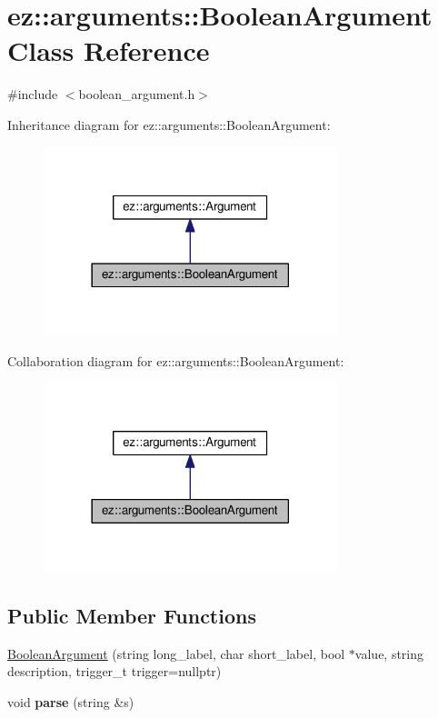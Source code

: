 \hypertarget{classez_1_1arguments_1_1BooleanArgument}{}\section{ez\+:\+:arguments\+:\+:Boolean\+Argument Class Reference}
\label{classez_1_1arguments_1_1BooleanArgument}


{\ttfamily \#include $<$boolean\+\_\+argument.\+h$>$}



Inheritance diagram for ez\+:\+:arguments\+:\+:Boolean\+Argument\+:
\nopagebreak
\begin{figure}[H]
\begin{center}
\leavevmode
\includegraphics[width=242pt]{classez_1_1arguments_1_1BooleanArgument__inherit__graph}
\end{center}
\end{figure}


Collaboration diagram for ez\+:\+:arguments\+:\+:Boolean\+Argument\+:
\nopagebreak
\begin{figure}[H]
\begin{center}
\leavevmode
\includegraphics[width=242pt]{classez_1_1arguments_1_1BooleanArgument__coll__graph}
\end{center}
\end{figure}
\subsection*{Public Member Functions}
\begin{DoxyCompactItemize}
\item 
\hyperlink{classez_1_1arguments_1_1BooleanArgument_a1d5bfd420e261e25ce2d3efc175ee7b0}{Boolean\+Argument} (string long\+\_\+label, char short\+\_\+label, bool $\ast$value, string description, trigger\+\_\+t trigger=nullptr)
\item 
\mbox{\label{classez_1_1arguments_1_1BooleanArgument_af242aa0103bac81883b6d5b5e6861ad7}} 
void {\bfseries parse} (string \&s)
\end{DoxyCompactItemize}
